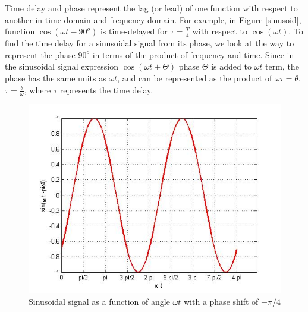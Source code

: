 \documentclass{ximera}
\begin{document}
\begin{definition}
Time delay and phase represent the lag (or lead) of one function with respect to another in time domain and frequency domain. For example, in Figure \ref{sinusoid}, function $ \cos(\omega t - 90^o)$ is time-delayed for $\tau = \frac{T}{4}$ with respect to $\cos (\omega t)$. To find the time delay for a sinusoidal signal from its phase, we look at the way to represent the phase $90^o$ in terms of the product of frequency and time. Since in the sinusoidal signal expression $\cos (\omega t + \Theta)$  phase $\Theta$ is added to $\omega t$ term, the phase has the same units as $\omega t$, and can be represented as the product of $\omega \tau = \theta$, $\tau = \frac{\theta}{\omega}$, where $\tau$ represents the time delay.
\end{definition}









\begin{figure} [htbp]
\includegraphics[scale=0.4]{../jpg/cpef4.jpg}
\caption{Sinusoidal signal as a function of angle $\omega t$ with a phase shift of $-\pi/4$}
\label{sinMinus45Ph}
\end{figure}
\end{document}
